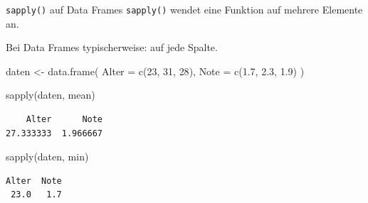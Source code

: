 \documentclass[
  10pt,
  ignorenonframetext,
  aspectratio=169,
]{beamer}
\newenvironment{Shaded}{}{}
\newcommand{\AttributeTok}[1]{\textcolor[rgb]{0.49,0.56,0.16}{#1}}
\newcommand{\DecValTok}[1]{\textcolor[rgb]{0.25,0.63,0.44}{#1}}
\newcommand{\FloatTok}[1]{\textcolor[rgb]{0.25,0.63,0.44}{#1}}
\newcommand{\FunctionTok}[1]{\textcolor[rgb]{0.02,0.16,0.49}{#1}}
\newcommand{\NormalTok}[1]{#1}
\newcommand{\OtherTok}[1]{\textcolor[rgb]{0.00,0.44,0.13}{#1}}
\begin{document}
\begin{frame}[fragile]{\texttt{sapply()} auf Data Frames}
\label{sapply-auf-data-frames}
\texttt{sapply()} wendet eine Funktion auf mehrere Elemente an.

Bei Data Frames typischerweise: auf jede Spalte.

\begin{Shaded}
\begin{Highlighting}[]
\NormalTok{daten }\OtherTok{\textless{}{-}} \FunctionTok{data.frame}\NormalTok{(}
  \AttributeTok{Alter =} \FunctionTok{c}\NormalTok{(}\DecValTok{23}\NormalTok{, }\DecValTok{31}\NormalTok{, }\DecValTok{28}\NormalTok{),}
  \AttributeTok{Note =} \FunctionTok{c}\NormalTok{(}\FloatTok{1.7}\NormalTok{, }\FloatTok{2.3}\NormalTok{, }\FloatTok{1.9}\NormalTok{)}
\NormalTok{)}

\FunctionTok{sapply}\NormalTok{(daten, mean)}
\end{Highlighting}
\end{Shaded}

\begin{verbatim}
    Alter      Note 
27.333333  1.966667 
\end{verbatim}

\begin{Shaded}
\begin{Highlighting}[]
\FunctionTok{sapply}\NormalTok{(daten, min)}
\end{Highlighting}
\end{Shaded}

\begin{verbatim}
Alter  Note 
 23.0   1.7 
\end{verbatim}
\end{frame}
\end{document}
